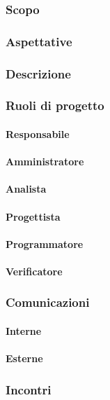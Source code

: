 \subsubsection{Scopo}
\subsubsection{Aspettative}
\subsubsection{Descrizione}
\subsubsection{Ruoli di progetto}
 \paragraph{Responsabile}
 \paragraph{Amministratore}
 \paragraph{Analista}
 \paragraph{Progettista}
 \paragraph{Programmatore}
 \paragraph{Verificatore}
\subsubsection{Comunicazioni}
 \paragraph{Interne}
 \paragraph{Esterne}
\subsubsection{Incontri}

